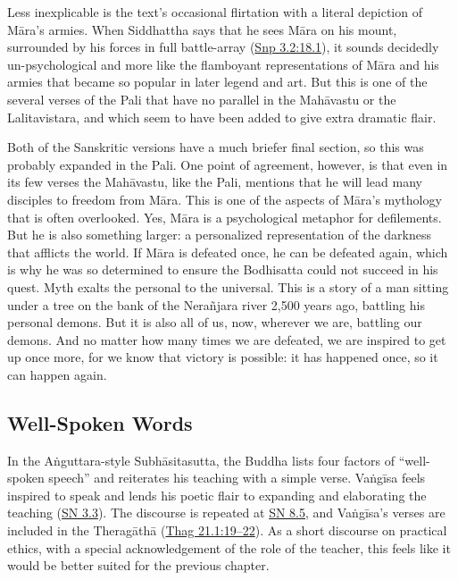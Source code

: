 \documentclass[12pt,openany]{book}%
\begin{document}
Less inexplicable is the text’s occasional flirtation with a literal depiction of \textsanskrit{Māra}’s armies. When Siddhattha says that he sees \textsanskrit{Māra} on his mount, surrounded by his forces in full battle-array (\href{https://suttacentral.net/snp3.2/en/sujato\#18.1}{Snp 3.2:18.1}), it sounds decidedly un-psychological and more like the flamboyant representations of \textsanskrit{Māra} and his armies that became so popular in later legend and art. But this is one of the several verses of the Pali that have no parallel in the \textsanskrit{Mahāvastu} or the Lalitavistara, and which seem to have been added to give extra dramatic flair.

Both of the Sanskritic versions have a much briefer final section, so this was probably expanded in the Pali. One point of agreement, however, is that even in its few verses the \textsanskrit{Mahāvastu}, like the Pali, mentions that he will lead many disciples to freedom from \textsanskrit{Māra}. This is one of the aspects of \textsanskrit{Māra}’s mythology that is often overlooked. Yes, \textsanskrit{Māra} is a psychological metaphor for defilements. But he is also something larger: a personalized representation of the darkness that afflicts the world. If \textsanskrit{Māra} is defeated once, he can be defeated again, which is why he was so determined to ensure the Bodhisatta could not succeed in his quest. Myth exalts the personal to the universal. This is a story of a man sitting under a tree on the bank of the \textsanskrit{Nerañjara} river 2,500 years ago, battling his personal demons. But it is also all of us, now, wherever we are, battling our demons. And no matter how many times we are defeated, we are inspired to get up once more, for we know that victory is possible: it has happened once, so it can happen again.

\subsection*{Well-Spoken Words}

In the \textsanskrit{Aṅguttara}-style \textsanskrit{Subhāsitasutta}, the Buddha lists four factors of “well-spoken speech” and reiterates his teaching with a simple verse. \textsanskrit{Vaṅgīsa} feels inspired to speak and lends his poetic flair to expanding and elaborating the teaching (\href{https://suttacentral.net/snp3.3/en/sujato}{SN 3.3}). The discourse is repeated at \href{https://suttacentral.net/snp8.5/en/sujato}{SN 8.5}, and \textsanskrit{Vaṅgīsa}’s verses are included in the \textsanskrit{Theragāthā} (\href{https://suttacentral.net/thag21.1/en/sujato\#19}{Thag 21.1:19–22}). As a short discourse on practical ethics, with a special acknowledgement of the role of the teacher, this feels like it would be better suited for the previous chapter.
\end{document}
